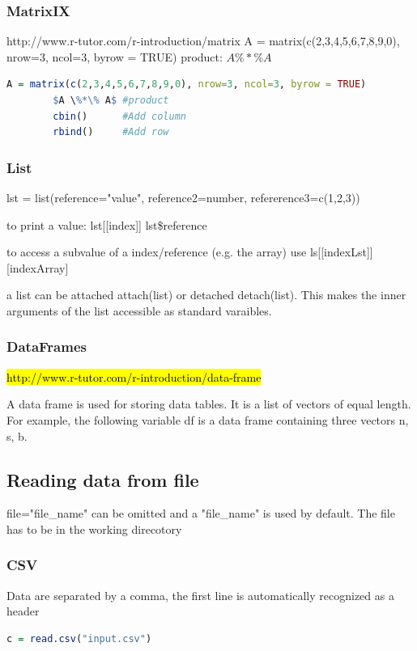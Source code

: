	\subsubsection{MatrixIX}
	http://www.r-tutor.com/r-introduction/matrix
	A = matrix(c(2,3,4,5,6,7,8,9,0), nrow=3, ncol=3, byrow = TRUE)
	product: $A \%*\% A$
	\begin{lstlisting}[language=R]
		A = matrix(c(2,3,4,5,6,7,8,9,0), nrow=3, ncol=3, byrow = TRUE)
		$A \%*\% A$	#product
		cbin() 		#Add column
		rbind() 	#Add row
	\end{lstlisting}
	
	\subsubsection{List}
	lst = list(reference="value", reference2=number, refererence3=c(1,2,3))

	to print a value:
	lst[[index]]
	lst\$reference

	to access a subvalue of a index/reference (e.g. the array) use 
	ls[[indexLst]][indexArray]

	a list can be attached attach(list) or detached detach(list). This makes the inner arguments of the list accessible as standard varaibles.
	
	\subsubsection{DataFrames}
	\hl{http://www.r-tutor.com/r-introduction/data-frame}
	
	A data frame is used for storing data tables. It is a list of vectors of equal length. For example, the following variable df is a data frame containing three vectors n, s, b.
	
	\subsection{Reading data from file}
	file="file\_name" can be omitted and a "file\_name" is used by default. The file has to be in the working direcotory

	\subsubsection{CSV}
	Data are separated by a comma, the first line is automatically recognized as a header
	\begin{lstlisting}[language=R]
		c = read.csv("input.csv")
	\end{lstlisting}
	
